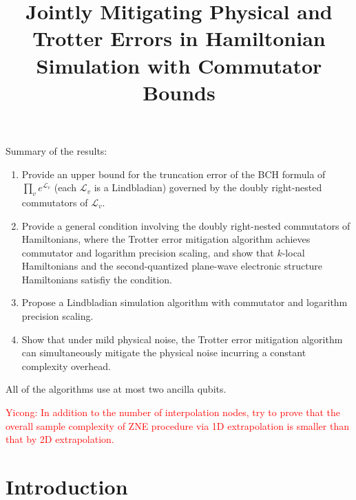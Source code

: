 \documentclass[11pt]{article}
\title{Jointly Mitigating Physical and Trotter Errors in Hamiltonian Simulation with Commutator Bounds
}
\author{}
\date{}
\newcommand{\mc}{\mathcal}
\begin{document}
\maketitle

Summary of the results: 
\begin{enumerate}
    \item Provide an upper bound for the truncation error of the BCH formula of $\prod_v e^{\mc L_v}$ (each $\mc L_v$ is a Lindbladian) governed by the doubly right-nested commutators of $\mc L_v$.
    \item Provide a general condition involving the doubly right-nested commutators of Hamiltonians, where the Trotter error mitigation algorithm \cite{watson2025exponentially} achieves commutator and logarithm precision scaling, and show that $k$-local Hamiltonians and the second-quantized plane-wave electronic structure Hamiltonians satisfiy the condition.
    \item Propose a Lindbladian simulation algorithm with commutator and logarithm precision scaling. 
    \item Show that under mild physical noise, the Trotter error mitigation algorithm can simultaneously mitigate the physical noise incurring a constant complexity overhead. 
\end{enumerate}
All of the algorithms use at most two ancilla qubits. 

\textcolor{red}{Yicong: In addition to the number of interpolation nodes, try to prove that the overall sample complexity of ZNE procedure via 1D extrapolation is smaller than that by 2D extrapolation.}

\section{Introduction}
\end{document}
